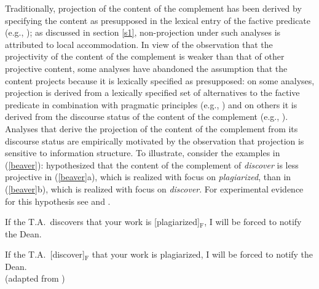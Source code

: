 \documentclass[11pt,fleqn]{article}
\newcommand{\6}{\mbox{$[\hspace*{-.6mm}[$}}
\newcommand{\9}{\mbox{$]\hspace*{-.6mm}]$}}
\begin{document}
Traditionally, projection of the content of the complement has been derived by specifying the content as presupposed in the lexical entry of the factive predicate (e.g., \citealt{heim83,vds92}); as discussed in section \ref{s1}, non-projection under such analyses is attributed to local accommodation. In view of the observation that the projectivity of the content of the complement is weaker than that of other projective content, some analyses have abandoned the assumption that the content projects because it is lexically specified as presupposed: on some analyses, projection is derived from a lexically specified set of alternatives to the factive predicate in combination with pragmatic principles (e.g., \citealt{abusch02,abusch10,romoli2015}) and on others it is derived from the discourse status of the content of the complement (e.g., \citealt{abrusan2011,abrusan2016,brst-salt10,best-question}). Analyses that derive the projection of the content of the complement from its discourse status are empirically motivated by the observation that projection is sensitive to information structure. To illustrate, consider the examples in (\ref{beaver}): \citet{beaver-belly} hypothesized that the content of the complement of {\em discover} is less projective in (\ref{beaver}a), which is realized with focus on {\em plagiarized}, than in (\ref{beaver}b), which is realized with focus on {\em discover}. For experimental evidence for this hypothesis see \citealt{cummins-rohde2015,tonhauser-salt26,djaerv-bacovcin-salt27} and \citealt{mahler-nels}.

\begin{exe}
\ex\label{beaver}
\begin{xlist}
\ex If the T.A.\ discovers that your work is [plagiarized]$_{\mbox{F}}$, I will be forced to notify the Dean.

\ex If the T.A.\  [discover]$_{\mbox{F}}$ that your work is plagiarized, I will be forced to notify the Dean. \\ \hspace*{.2cm} \hfill (adapted from \citealt[93]{beaver-belly})

\end{xlist}
\end{exe}
\end{document}
